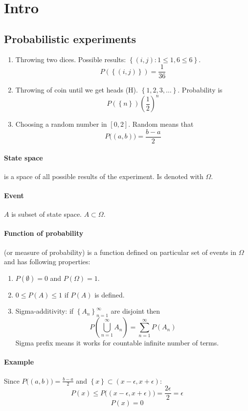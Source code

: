 \section{Intro}
\subsection{Probabilistic experiments}
\begin{enumerate}
	\item Throwing two dices. Possible results: $\left\{(i,j) : 1\leq 1,6 \leq 6 \right\}$.
	$$P(\left\{ (i,j) \right\}) = \frac{1}{36}$$
	\item Throwing of coin until we get heads (H). $\left\{ 1,2,3,\dots \right\}$. Probability is $$P(\left\{ n \right\})\left(\frac{1}{2}\right)^n$$
	\item Choosing a random number in $[0,2]$. Random means that $$P\bigg( (a,b) \bigg) = \frac{b-a}{2}$$
\end{enumerate}

\paragraph{State space} is a space of all possible results of the experiment. Is denoted with $\Omega$.
\paragraph{Event} $A$ is subset of state space. $A \subset \Omega$.
\paragraph{Function of probability} (or measure of probability) is a function defined on particular set of events in $\Omega$ and has following properties:
\begin{enumerate}
	\item $P(\emptyset) = 0$ and $P(\Omega) = 1$.
	\item $0\leq P(A) \leq 1$ if $P(A)$ is defined.
	\item Sigma-additivity: if $\left\{ A_n \right\}_{n=1}^\infty$ are disjoint then
	$$P(\bigcup_{n=1}^\infty A_n) = \sum_{n=1}^\infty P(A_n)$$
	Sigma prefix means it works for countable infinite number of terms.
\end{enumerate}

\paragraph{Example}
Since $P\bigg((a,b)\bigg) = \frac{b-a}{2}$ and $\left\{ x \right\} \subset (x-\epsilon, x+\epsilon)$:
$$P(x) \leq P\bigg( (x-\epsilon, x+\epsilon) \bigg) = \frac{2\epsilon}{2} = \epsilon$$
$$P(x)  = 0$$

